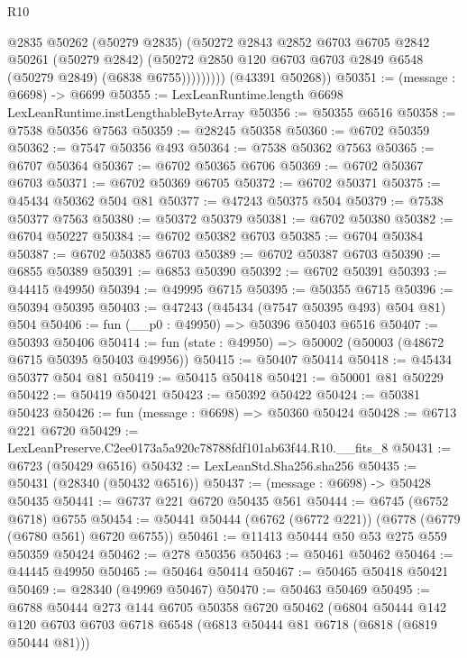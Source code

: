 \begin{lexlean}{R10}
\begin{coremodule}
                  @2835
                  @50262
                  (@50279 @2835)
                  (@50272
                    @2843
                    @2852
                    @6703
                    @6705
                    @2842
                    @50261
                    (@50279 @2842)
                    (@50272 @2850 @120 @6703 @6703 @2849 @6548 (@50279 @2849) (@6838 @6755)))))))))
      (@43391 @50268))
@50351 := (message : @6698) -> @6699
@50355 := LexLeanRuntime.length @6698 LexLeanRuntime.instLengthableByteArray
@50356 := @50355 @6516
@50358 := @7538 @50356 @7563
@50359 := @28245 @50358
@50360 := @6702 @50359
@50362 := @7547 @50356 @493
@50364 := @7538 @50362 @7563
@50365 := @6707 @50364
@50367 := @6702 @50365 @6706
@50369 := @6702 @50367 @6703
@50371 := @6702 @50369 @6705
@50372 := @6702 @50371
@50375 := @45434 @50362 @504 @81
@50377 := @47243 @50375 @504
@50379 := @7538 @50377 @7563
@50380 := @50372 @50379
@50381 := @6702 @50380
@50382 := @6704 @50227
@50384 := @6702 @50382 @6703
@50385 := @6704 @50384
@50387 := @6702 @50385 @6703
@50389 := @6702 @50387 @6703
@50390 := @6855 @50389
@50391 := @6853 @50390
@50392 := @6702 @50391
@50393 := @44415 @49950
@50394 := @49995 @6715
@50395 := @50355 @6715
@50396 := @50394 @50395
@50403 := @47243 (@45434 (@7547 @50395 @493) @504 @81) @504
@50406 := fun (__p0 : @49950) => @50396 @50403 @6516
@50407 := @50393 @50406
@50414 := fun (state : @49950) => @50002 (@50003 (@48672 @6715 @50395 @50403 @49956))
@50415 := @50407 @50414
@50418 := @45434 @50377 @504 @81
@50419 := @50415 @50418
@50421 := @50001 @81 @50229
@50422 := @50419 @50421
@50423 := @50392 @50422
@50424 := @50381 @50423
@50426 := fun (message : @6698) => @50360 @50424
@50428 := @6713 @221 @6720
@50429 := LexLeanPreserve.C2ee0173a5a920c78788fdf101ab63f44.R10.__fits_8
@50431 := @6723 (@50429 @6516)
@50432 := LexLeanStd.Sha256.sha256
@50435 := @50431 (@28340 (@50432 @6516))
@50437 := (message : @6698) -> @50428 @50435
@50441 := @6737 @221 @6720 @50435 @561
@50444 := @6745 (@6752 @6718) @6755
@50454 := @50441 @50444 (@6762 (@6772 @221)) (@6778 (@6779 (@6780 @561) @6720 @6755))
@50461 := @11413 @50444 @50 @53 @275 @559 @50359 @50424
@50462 := @278 @50356
@50463 := @50461 @50462
@50464 := @44445 @49950
@50465 := @50464 @50414
@50467 := @50465 @50418 @50421
@50469 := @28340 (@49969 @50467)
@50470 := @50463 @50469
@50495 := @6788
    @50444
    @273
    @144
    @6705
    @50358
    @6720
    @50462
    (@6804
      @50444
      @142
      @120
      @6703
      @6703
      @6718
      @6548
      (@6813 @50444 @81 @6718 (@6818 (@6819 @50444 @81)))

\end{coremodule}
\end{lexlean}
